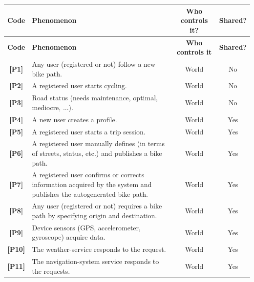 \documentclass{Configuration_Files/PoliMi3i_thesis}
\begin{document}
\begin{center}
    \begin{longtable}{|c|p{7cm}|c|c|}
    
        \hline
        \textbf{Code} & \textbf{Phenomenon} & \textbf{Who controls it?} & \textbf{Shared?} \\ \hline
        \endfirsthead
        
        \hline
        \textbf{Code} & \textbf{Phenomenon} & \textbf{Who controls it} & \textbf{Shared?} \\ \hline
        \endhead
        
        \hline
         \textbf{[P1]} & Any user (registered or not) follow a new bike path. & World & No\\ \hline
         \textbf{[P2]} & A registered user starts cycling. & World & No \\ \hline
         \textbf{[P3]} & Road status (needs maintenance, optimal, mediocre, ...). & World & No \\ \hline
        
         \textbf{[P4]} & A new user creates a profile. & World & Yes \\ \hline
         \textbf{[P5]} & A registered user starts a trip session. & World & Yes \\ \hline
         \textbf{[P6]} & A registered user manually defines (in terms of streets, status, etc.) and publishes a bike path. & World & Yes \\ \hline
         \textbf{[P7]} & A registered user confirms or corrects information acquired by the system and publishes the autogenerated bike path. & World & Yes \\ \hline
         \textbf{[P8]} & Any user (registered or not) requires a bike path by specifying origin and destination. & World & Yes \\ \hline
         \textbf{[P9]} & Device sensors (GPS, accelerometer, gyroscope) acquire data. & World & Yes \\ \hline
        \textbf{[P10]} & The weather-service responds to the request. & World & Yes \\ \hline
        \textbf{[P11]} & The navigation-system service responds to the requests. & World & Yes \\ \hline
        

\end{longtable}
\end{center}
\end{document}
